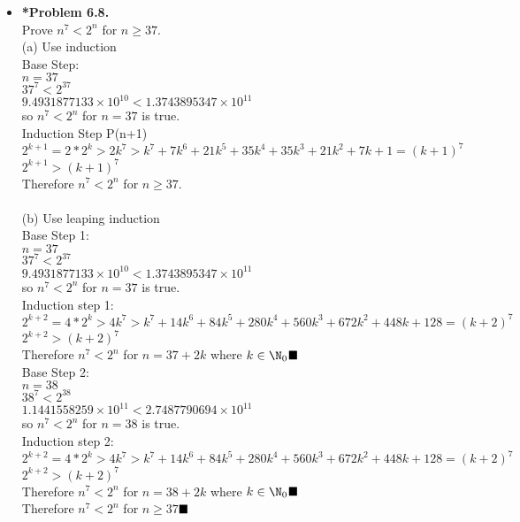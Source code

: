 \documentclass[11pt]{article}
\begin{document}
\begin{itemize}
\vspace{0.1in}

\item \textbf{*Problem 6.8.} 
\\Prove $n^7<2^n$ for $n\ge37$.
\\(a) Use induction
\\Base Step:
\\$n = 37$
\\$37^7<2^{37}$
\\$9.4931877133\times10^{10} < 1.3743895347\times10^{11}$
\\so $n^7 < 2^n$ for $n = 37$ is true.
\\Induction Step P(n+1)
\\$2^{k+1}=2*2^k>2k^7>k^7+7k^6+21k^5+35k^4+35k^3+21k^2+7k+1=(k+1)^7$
\\$2^{k+1}>(k+1)^7$
\\Therefore $n^7<2^n$ for $n\ge37$.
\\ 
\\(b) Use leaping induction
\\Base Step 1:
\\$n = 37$
\\$37^7<2^{37}$
\\$9.4931877133\times10^{10} < 1.3743895347\times10^{11}$
\\so $n^7 < 2^n$ for $n = 37$ is true.
\\Induction step 1:
\\$2^{k+2}=4*2^k>4k^7>k^7+14k^6+84k^5+280k^4+560k^3+672k^2+448k+128=(k+2)^7$
\\$2^{k+2}>(k+2)^7$
\\Therefore $n^7<2^n$ for $n=37+2k$ where $k\in\N_0$$\hfill\blacksquare$
\\Base Step 2:
\\$n = 38$
\\$38^7<2^{38}$
\\$1.1441558259\times10^{11} < 2.7487790694\times10^{11}$
\\so $n^7 < 2^n$ for $n = 38$ is true.
\\Induction step 2:
\\$2^{k+2}=4*2^k>4k^7>k^7+14k^6+84k^5+280k^4+560k^3+672k^2+448k+128=(k+2)^7$
\\$2^{k+2}>(k+2)^7$
\\Therefore $n^7<2^n$ for $n=38+2k$ where $k\in\N_0$$\hfill\blacksquare$
\\Therefore $n^7<2^n$ for $n\ge37$$\hfill\blacksquare$

\vspace{0.1in}


\end{itemize}
\end{document}
